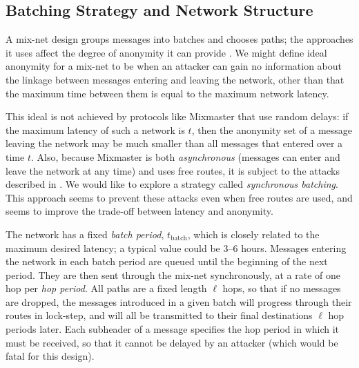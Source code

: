 \documentclass[11pt]{IEEEtran}
\begin{document}
\subsection{Batching Strategy and Network Structure}
\label{subsec:batching}


A mix-net design groups messages into batches and chooses paths; the
approaches it uses affect the degree of anonymity it can provide
\cite{batching-taxonomy}.
We might define ideal anonymity for a mix-net to be when an attacker can
gain no information about the linkage between messages entering and
leaving the network, other than that the maximum time between them is
equal to the maximum network latency.


This ideal is not achieved by protocols like Mixmaster that use random
delays: if the maximum latency of such a network is $t$, then the
anonymity set of a message leaving the network may be much smaller
than all messages that entered over a time $t$.
Also, because Mixmaster is both {\em asynchronous} (messages can enter and
leave the network at any time) and uses free routes, it is subject to
the attacks described in \cite{disad-free-routes}.
We would like to explore a
strategy called {\em synchronous batching}. This approach seems to prevent
these attacks even when free routes are used, and seems to improve the
trade-off between latency and anonymity.

The network has a fixed {\em batch period}, $t_\mathrm{batch}$, which is closely
related to the maximum desired latency; a typical value could be 3--6 hours.
Messages entering the network in each batch period are queued until
the beginning of the next period. They are then sent through the mix-net
synchronously, at a rate of one hop per {\em hop period}. All paths are
a fixed length $\ell$ hops, so that if no messages are dropped, the messages
introduced in a given batch will progress through their routes in
lock-step, and will all be transmitted to their final destinations $\ell$
hop periods later. Each subheader of a message specifies the hop
period in which it must be received, so that it cannot be delayed by an
attacker (which would be fatal for this design).
\end{document}
